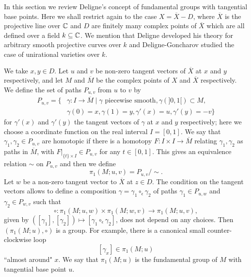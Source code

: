 In this section we review Deligne's concept of fundamental groups with tangential base points. 
Here we shall restrict again to the case $X=\overline{X}-D$, where $\overline{X}$ is the projective line over $\mathbb{C}$ and $D$ are finitely many complex points of $\overline{X}$ which are all defined over a field $k\subseteq \mathbb{C}$. 
We mention that Deligne \cite{deligne:galoisgroups} developed his theory for arbitrary smooth projective curves over $k$ and Deligne-Goncharov \cite{dego:motivicfundamentalgroups} studied the case of unirational varieties over $k$.

We take $x,y \in D$. Let $u$ and $v$ be non-zero tangent vectors of $\overline{X}$ at $x$ and $y$ respectively, and let $M$ and $\overline{M}$ be the complex points of $X$ and $\overline{X}$ respectively. We define the set of paths $P_{u,v}$ from $u$ to $v$ by
\begin{align*}P_{u,v} = \{ &\gamma : I \to \overline{M} \mid \textrm{$\gamma$ piecewise smooth}, \gamma(]0,1[) \subset M, \\
&\gamma(0) = x, \gamma(1) = y, \gamma'(x) = u, \gamma'(y) = -v \}
\end{align*}
for $\gamma'(x)$ and $\gamma'(y)$ the tangent vectors of $\gamma$ at $x$ and $y$ respectively; here we choose a coordinate function on the real interval $I=[0,1]$. 
We say that $\gamma_1,\gamma_2\in P_{u,v}$ are homotopic if there is a homotopy $F:I\times I\to \overline{M}$ relating $\gamma_1,\gamma_2$ as paths in $\overline{M}$, with $F\rvert_{\{t\}\times I}\in P_{u,v}$ for any $t\in [0,1]$. 
This gives an equivalence relation $\sim$ on $P_{u,v}$ and then we define
$$\pi_1(M; u,v)=P_{u,v}/\sim.$$ 
Let $w$ be a non-zero tangent vector to $\overline{X}$ at $z\in D$. 
The condition on the tangent vectors allows to define a composition $\gamma=\gamma_1\circ_{\epsilon}\gamma_2$ of paths $\gamma_1\in P_{u,w}$ and $\gamma_2\in P_{w,v}$  such that  $$\circ:\pi_1(M;u,w)\times \pi_1(M;w,v)\to \pi_1(M;u,v),$$ given by $([\gamma_1],[\gamma_2])\mapsto [\gamma_1\circ_{\epsilon}\gamma_2]$,   does not depend on any choices.
Then $(\pi_1(M;u),\circ)$ is a group. 
For example, there is a canonical small counter-clockwise loop $$[\gamma_x]\in \pi_1(M; u)$$ ``almost around" $x$. %
We say that $\pi_1(M;u)$ is the fundamental group of $M$ with tangential base point $u$. 

